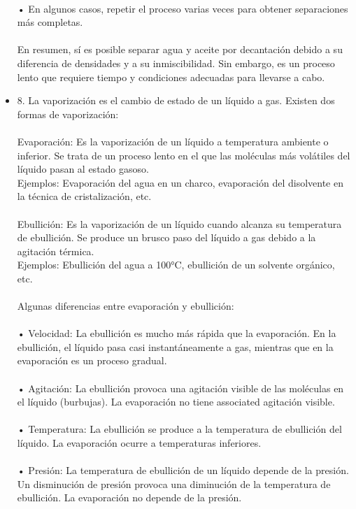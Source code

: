 \documentclass{article}
\begin{document}
\begin{itemize}
\\
• En algunos casos, repetir el proceso varias veces para obtener separaciones más completas.\\
\\
En resumen, sí es posible separar agua y aceite por decantación debido a su diferencia de densidades y a su inmiscibilidad. Sin embargo, es un proceso lento que requiere tiempo y condiciones adecuadas para llevarse a cabo.\\
\item{8.}
La vaporización es el cambio de estado de un líquido a gas. Existen dos formas de vaporización:\\
\\
Evaporación: Es la vaporización de un líquido a temperatura ambiente o inferior. Se trata de un proceso lento en el que las moléculas más volátiles del líquido pasan al estado gasoso.\\
Ejemplos: Evaporación del agua en un charco, evaporación del disolvente en la técnica de cristalización, etc.\\
\\
Ebullición: Es la vaporización de un líquido cuando alcanza su temperatura de ebullición. Se produce un brusco paso del líquido a gas debido a la agitación térmica.\\
Ejemplos: Ebullición del agua a 100°C, ebullición de un solvente orgánico, etc.\\
\\
Algunas diferencias entre evaporación y ebullición:\\
\\
• Velocidad: La ebullición es mucho más rápida que la evaporación. En la ebullición, el líquido pasa casi instantáneamente a gas, mientras que en la evaporación es un proceso gradual.\\
\\
• Agitación: La ebullición provoca una agitación visible de las moléculas en el líquido (burbujas). La evaporación no tiene associated agitación visible.\\
\\
• Temperatura: La ebullición se produce a la temperatura de ebullición del líquido. La evaporación ocurre a temperaturas inferiores.\\
\\
• Presión: La temperatura de ebullición de un líquido depende de la presión. Un disminución de presión provoca una diminución de la temperatura de ebullición. La evaporación no depende de la presión.\\

\end{itemize}
\end{document}
